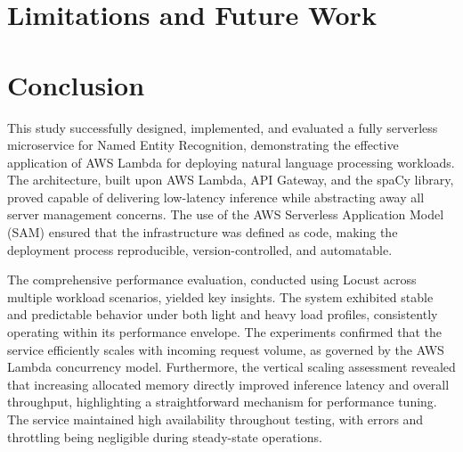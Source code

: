 \documentclass[11pt,a4paper]{article}
\begin{document}


\section{Limitations and Future Work}


\section{Conclusion}
This study successfully designed, implemented, and evaluated a fully serverless microservice for Named Entity Recognition, demonstrating the effective application of AWS Lambda for deploying natural language processing workloads. The architecture, built upon AWS Lambda, API Gateway, and the spaCy library, proved capable of delivering low-latency inference while abstracting away all server management concerns. The use of the AWS Serverless Application Model (SAM) ensured that the infrastructure was defined as code, making the deployment process reproducible, version-controlled, and automatable.

The comprehensive performance evaluation, conducted using Locust across multiple workload scenarios, yielded key insights. The system exhibited stable and predictable behavior under both light and heavy load profiles, consistently operating within its performance envelope. The experiments confirmed that the service efficiently scales with incoming request volume, as governed by the AWS Lambda concurrency model. Furthermore, the vertical scaling assessment revealed that increasing allocated memory directly improved inference latency and overall throughput, highlighting a straightforward mechanism for performance tuning. The service maintained high availability throughout testing, with errors and throttling being negligible during steady-state operations.
\end{document}
